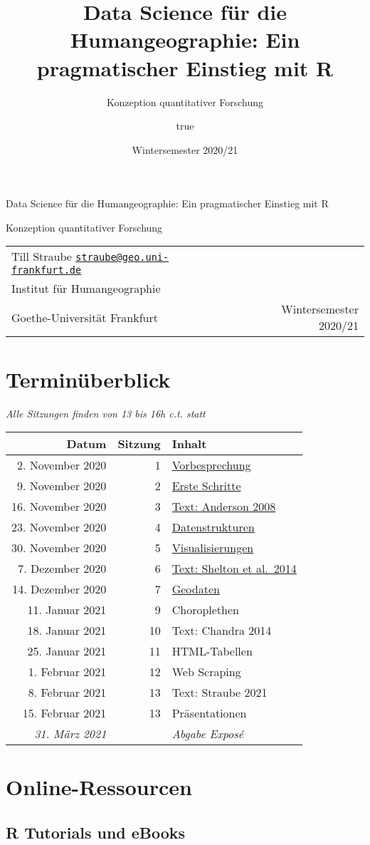 \documentclass[11pt,german,a4paper]{article}
\title{Data Science für die Humangeographie: Ein pragmatischer Einstieg mit R}
\subtitle{Konzeption quantitativer Forschung}
\author{true}
\date{Wintersemester 2020/21}
\makeatletter
\renewcommand{\maketitle}{
  \newpage
  \begingroup
    \setlength{\parindent}{0pt}
    \setlength{\parskip}{4pt}
    {\fontseries{b}\selectfont\Huge{Data Science für die Humangeographie: Ein pragmatischer Einstieg mit R}\par}
    {\fontseries{l}\LARGE{Konzeption quantitativer Forschung}\par\bigskip}

    \bigskip

    \begin{tabularx}{\textwidth}{@{}X r}
                  Till Straube
        \newline \href{mailto:straube@geo.uni-frankfurt.de}{\nolinkurl{straube@geo.uni-frankfurt.de}}
                  \medskip\newline
          {\renewcommand\\{\newline}Institut für Humangeographie\\
Goethe-Universität Frankfurt}
         &
                    Wintersemester 2020/21
        \end{tabularx}
  \endgroup
  \vspace{1.1cm}
  \thispagestyle{plain}%
}
\makeatother
\begin{document}
\maketitle

{
\setcounter{tocdepth}{2}
\tableofcontents
}
\hypertarget{terminuxfcberblick}{%
\section*{Terminüberblick}\label{terminuxfcberblick}}

\emph{Alle Sitzungen finden von 13 bis 16h c.t. statt}

\begin{longtable}[]{@{}rrl@{}}
\toprule
Datum & Sitzung & Inhalt\tabularnewline
\midrule
\endhead
2. November 2020 & 1 & \protect\hyperlink{vorbesprechung}{Vorbesprechung}\tabularnewline
9. November 2020 & 2 & \protect\hyperlink{erste-schritte}{Erste Schritte}\tabularnewline
16. November 2020 & 3 & \protect\hyperlink{text-anderson-2008}{Text: Anderson 2008}\tabularnewline
23. November 2020 & 4 & \protect\hyperlink{datenstrukturen}{Datenstrukturen}\tabularnewline
30. November 2020 & 5 & \protect\hyperlink{visualisierungen}{Visualisierungen}\tabularnewline
7. Dezember 2020 & 6 & \protect\hyperlink{text-shelton-et-al.-2014}{Text: Shelton et al.~2014}\tabularnewline
14. Dezember 2020 & 7 & \protect\hyperlink{geodaten}{Geodaten}\tabularnewline
11. Januar 2021 & 9 & Choroplethen\tabularnewline
18. Januar 2021 & 10 & Text: Chandra 2014\tabularnewline
25. Januar 2021 & 11 & HTML-Tabellen\tabularnewline
1. Februar 2021 & 12 & Web Scraping\tabularnewline
8. Februar 2021 & 13 & Text: Straube 2021\tabularnewline
15. Februar 2021 & 13 & Präsentationen\tabularnewline
\emph{31. März 2021} & & \emph{Abgabe Exposé}\tabularnewline
\bottomrule
\end{longtable}

\hypertarget{online-ressourcen}{%
\section*{Online-Ressourcen}\label{online-ressourcen}}

\hypertarget{r-tutorials-und-ebooks}{%
\subsection*{R Tutorials und eBooks}\label{r-tutorials-und-ebooks}}
\end{document}
